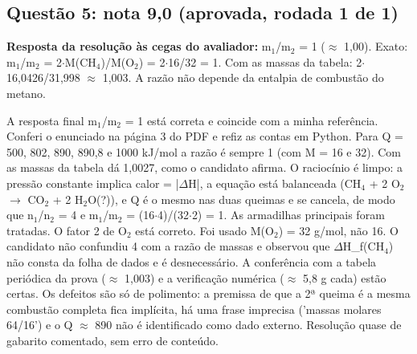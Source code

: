 \documentclass{article}%
\begin{document}
\subsection*{Questão 5: nota 9,0 (aprovada, rodada 1 de 1)}%
\textbf{Resposta da resolução às cegas do avaliador:} m$_{1}$/m$_{2}$ = 1 ($\approx$ 1,00). Exato: m$_{1}$/m$_{2}$ = 2$\cdot$M(CH$_{4}$)/M(O$_{2}$) = 2$\cdot$16/32 = 1. Com as massas da tabela: 2$\cdot$16,0426/31,998 $\approx$ 1,003. A razão não depende da entalpia de combustão do metano.\par %
A resposta final m$_{1}$/m$_{2}$ = 1 está correta e coincide com a minha referência. Conferi o enunciado na página 3 do PDF e refiz as contas em Python. Para Q = 500, 802, 890, 890,8 e 1000 kJ/mol a razão é sempre 1 (com M = 16 e 32). Com as massas da tabela dá 1,0027, como o candidato afirma. O raciocínio é limpo: a pressão constante implica calor = |$\Delta$H|, a equação está balanceada (CH$_{4}$ + 2 O$_{2}$ $\to$ CO$_{2}$ + 2 H$_{2}$O(?)), e Q é o mesmo nas duas queimas e se cancela, de modo que n$_{1}$/n$_{2}$ = 4 e m$_{1}$/m$_{2}$ = (16$\cdot$4)/(32$\cdot$2) = 1. As armadilhas principais foram tratadas. O fator 2 de O$_{2}$ está correto. Foi usado M(O$_{2}$) = 32 g/mol, não 16. O candidato não confundiu 4 com a razão de massas e observou que $\Delta$H\_f(CH$_{4}$) não consta da folha de dados e é desnecessário. A conferência com a tabela periódica da prova ($\approx$ 1,003) e a verificação numérica ($\approx$ 5,8 g cada) estão certas. Os defeitos são só de polimento: a premissa de que a 2ª queima é a mesma combustão completa fica implícita, há uma frase imprecisa ('massas molares 64/16') e o Q $\approx$ 890 não é identificado como dado externo. Resolução quase de gabarito comentado, sem erro de conteúdo.%
\end{document}
